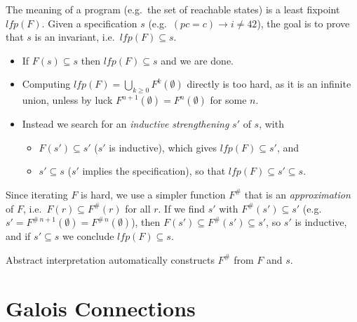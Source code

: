 The meaning of a program (e.g.\ the set of reachable states) is a least fixpoint $\mathit{lfp}(F)$. Given a specification $s$ (e.g.\ $(\mathit{pc} = c) \rightarrow i \ne 42$), the goal is to prove that $s$ is an invariant, i.e.\ $\mathit{lfp}(F) \subseteq s$.
\begin{itemize}
  \item If $F(s) \subseteq s$ then $\mathit{lfp}(F) \subseteq s$ and we are done.
  \item Computing $\mathit{lfp}(F) = \bigcup_{k \ge 0} F^k(\emptyset)$ directly is too hard, as it is an infinite union, unless by luck $F^{n+1}(\emptyset) = F^n(\emptyset)$ for some $n$.
  \item Instead we search for an \emph{inductive strengthening} $s'$ of $s$, with
  \begin{itemize}
    \item $F(s') \subseteq s'$ ($s'$ is inductive), which gives $\mathit{lfp}(F) \subseteq s'$, and
    \item $s' \subseteq s$ ($s'$ implies the specification), so that $\mathit{lfp}(F) \subseteq s' \subseteq s$.
  \end{itemize}
\end{itemize}
Since iterating $F$ is hard, we use a simpler function $F^\#$ that is an \emph{approximation} of $F$, i.e.\ $F(r) \subseteq F^\#(r)$ for all $r$. If we find $s'$ with $F^\#(s') \subseteq s'$ (e.g.\ $s' = F^{\#\,n+1}(\emptyset) = F^{\#\,n}(\emptyset)$), then $F(s') \subseteq F^\#(s') \subseteq s'$, so $s'$ is inductive, and if $s' \subseteq s$ we conclude $\mathit{lfp}(F) \subseteq s$.
 
Abstract interpretation automatically constructs $F^\#$ from $F$ and $s$.
 
\section{Galois Connections}
 
 
 
